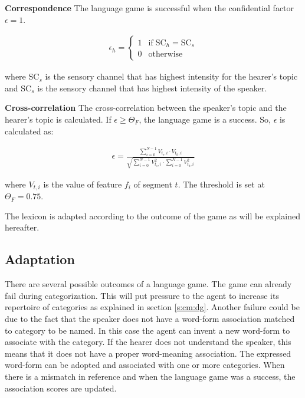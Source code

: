\begin{description}
\item {\bf Correspondence}
The language game is successful when the confidential factor $\epsilon=1$.
 
\begin{eqnarray}\epsilon_h = \left \{ \begin{array}{rl}
1 & \mbox{if}\;\mbox{SC}_h=\mbox{SC}_s\\
0 & \mbox{otherwise}
\end{array}
\right.
\end{eqnarray}

\noindent
where $\mbox{SC}_s$ is the sensory channel that has highest intensity for the hearer's topic and $\mbox{SC}_s$ is the sensory channel that has highest intensity of the speaker.
\item {\bf Cross-correlation} The cross-correlation between the speaker's topic and the hearer's topic is calculated. If $\epsilon \geq \Theta_F$, the language game is a success. So, $\epsilon$ is calculated as:

\begin{eqnarray}
\displaystyle
\epsilon=\frac{\sum_{i=0}^{N-1} V_{t_s,i} \cdot V_{t_h,i}}
{\sqrt{\sum_{i=0}^{N-1} V^2_{t_s,i} \cdot \sum_{i=0}^{N-1} V^2_{t_h,i}}}
\end{eqnarray}

\noindent
where $V_{t,i}$ is the value of feature $f_i$ of segment $t$. The threshold is set at $\Theta_F=0.75$.
\end{description}

The lexicon is adapted according to the outcome of the game as will be explained hereafter.

\subsection{Adaptation}

There are several possible outcomes of a language game. The game can already fail during categorization. This will put pressure to the agent to increase its repertoire of categories as explained in section \ref{s:cm:dg}. Another failure could be due to the fact that the speaker does not have a word-form association matched to category to be named. In this case the agent can invent a new word-form to associate with the category. If the hearer does not understand the speaker, this means that it does not have a proper word-meaning association. The expressed word-form can be adopted and associated with one or more categories. When there is a mismatch in reference and when the language game was a success, the association scores are updated.

